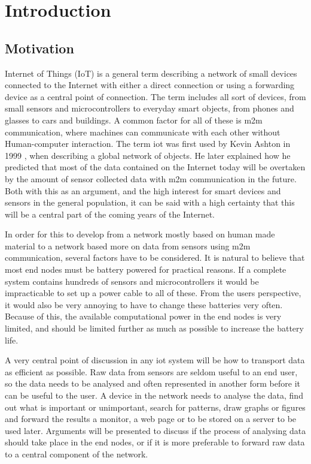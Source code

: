 \chapter{Introduction}
\label{chp:introduction} 


\section{Motivation}

\noindent Internet of Things (IoT) is a general term describing a network of small devices connected to the Internet with either a direct connection or using a forwarding device as a central point of connection. The term includes all sort of devices, from small sensors and microcontrollers to everyday smart objects, from phones and glasses to cars and buildings. A common factor for all of these is \gls{m2m} communication, where machines can communicate with each other without Human-computer interaction. The term \gls{iot} was first used by Kevin Ashton in 1999 \cite{ashton2009internet}, when describing a global network of objects. He later explained how he predicted that most of the data contained on the Internet today will be overtaken by the amount of sensor collected data with \gls{m2m} communication in the future. Both with this as an argument, and the high interest for smart devices and sensors in the general population, it can be said with a high certainty that this will be a central part of the coming years of the Internet. 

\noindent In order for this to develop from a network mostly based on human made material to a network based more on data from sensors using \gls{m2m} communication, several factors have to be considered. It is natural to believe that most end nodes must be battery powered for practical reasons. If a complete system contains hundreds of sensors and \glspl{microcontroller} it would be impracticable to set up a power cable to all of these. From the users perspective, it would also be very annoying to have to change these batteries very often. Because of this, the available computational power in the end nodes is very limited, and should be limited further as much as possible to increase the battery life. 

\noindent A very central point of discussion in any \gls{iot} system will be how to transport data as efficient as possible. Raw data from sensors are seldom useful to an end user, so the data needs to be analysed and often represented in another form before it can be useful to the user. A device in the network needs to analyse the data, find out what is important or unimportant, search for patterns, draw graphs or figures and forward the results a monitor, a web page or to be stored on a server to be used later. Arguments will be presented to discuss if the process of analysing data should take place in the end nodes, or if it is more preferable to forward raw data to a central component of the network. 


